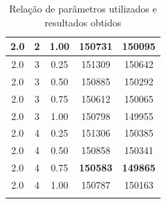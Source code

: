 \documentclass{article}
\begin{document}
\begin{longtable}[htbp]{|c|c|c|c|c|}
    2.0 & 2 & 1.00 & 150731 & 150095 \\ \hline
    2.0 & 3 & 0.25 & 151309 & 150642 \\ \hline
    2.0 & 3 & 0.50 & 150885 & 150292 \\ \hline
    2.0 & 3 & 0.75 & 150612 & 150065 \\ \hline
    2.0 & 3 & 1.00 & 150798 & 149955 \\ \hline
    2.0 & 4 & 0.25 & 151306 & 150385 \\ \hline
    2.0 & 4 & 0.50 & 150858 & 150341 \\ \hline
    2.0 & 4 & 0.75 & \textbf{150583} & \textbf{149865} \\ \hline
    2.0 & 4 & 1.00 & 150787 & 150163 \\ \hline

    \caption{Relação de parâmetros utilizados e resultados obtidos}
    \label{tab:res}
  \end{longtable}
\end{document}
